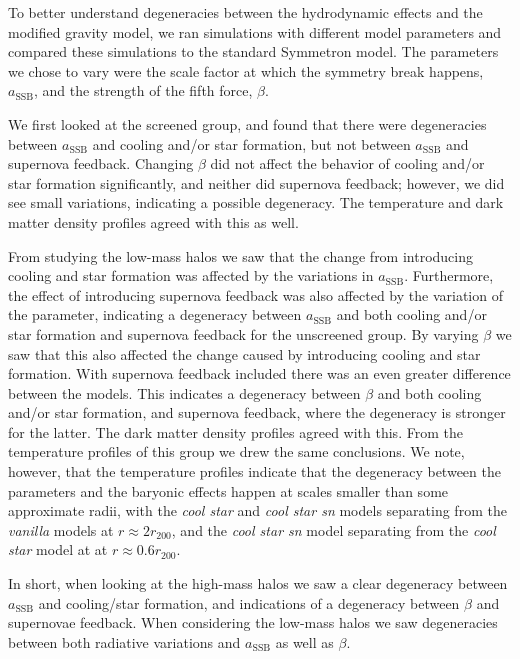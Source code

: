 \documentclass{aa}
\begin{document}
To better understand degeneracies between the hydrodynamic effects and the modified gravity model, we ran simulations with different model parameters and compared these simulations to the standard Symmetron model. The parameters we chose to vary were the scale factor at which the symmetry break happens, $a_{\mathrm{SSB}}$, and the strength of the fifth force, $\beta$.

We first looked at the screened group, and found that there were degeneracies between $a_{\mathrm{SSB}}$ and cooling and/or star formation, but not between $a_{\mathrm{SSB}}$ and supernova feedback. Changing $\beta$ did not affect the behavior of cooling and/or star formation significantly, and neither did supernova feedback; however, we did  see small variations, indicating a possible degeneracy. The temperature and dark matter density profiles agreed with this as well.

From studying the low-mass halos we saw that the change from introducing cooling and star formation was affected by the variations in $a_{\mathrm{SSB}}$. Furthermore, the effect of introducing supernova feedback was also affected by the variation of the parameter, indicating a degeneracy between $a_{\mathrm{SSB}}$ and both cooling and/or star formation and supernova feedback for the unscreened group. By varying $\beta$ we saw that this also affected the change caused by introducing cooling and star formation. With supernova feedback included there was an even greater difference between the models. This indicates a degeneracy between $\beta$ and both cooling and/or star formation, and supernova feedback, where the degeneracy is stronger for the latter.
The dark matter density profiles agreed with this.
From the temperature profiles of this group we drew the same conclusions. We note, however, that the temperature profiles indicate that the degeneracy between the parameters and the baryonic effects happen at scales smaller than some approximate radii, with the \textit{cool star} and \textit{cool star sn} models separating from the \textit{vanilla} models at $r \approx 2r_{200}$, and the \textit{cool star sn} model separating from the \textit{cool star} model at at $r \approx 0.6r_{200}$. 

In short, when looking at the high-mass halos we saw a clear degeneracy between $a_{\mathrm{SSB}}$ and cooling/star formation, and indications of a degeneracy between $\beta$ and supernovae feedback. When considering the low-mass halos we saw degeneracies between both radiative variations and $a_{\mathrm{SSB}}$ as well as $\beta$. 
\end{document}
